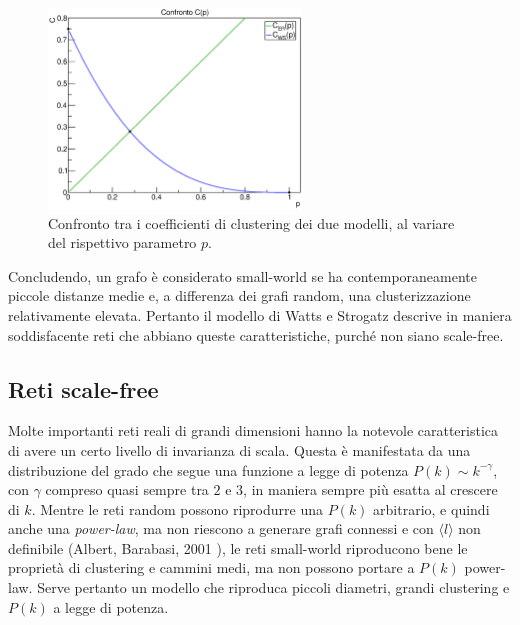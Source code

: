 \begin{figure}[t!]
	\centering
	\includegraphics[width=0.6\textwidth]{./Immagini/Par1/confrontoC}
	\caption{Confronto tra i coefficienti di clustering dei due modelli, al variare del rispettivo parametro $p$.}
	\label{fig:ring}
\end{figure}

Concludendo, un grafo è considerato small-world se ha contemporaneamente piccole distanze medie e, a differenza dei grafi random,  una clusterizzazione relativamente elevata. Pertanto il modello di Watts e Strogatz descrive in maniera soddisfacente reti che abbiano queste caratteristiche, purché non siano scale-free.

\subsection{Reti scale-free} 
Molte importanti reti reali di grandi dimensioni hanno la notevole caratteristica di avere un certo livello di invarianza di scala. Questa è manifestata da una distribuzione del grado che segue una funzione a legge di potenza $P(k)\sim k^{-\gamma}$, con $\gamma$ compreso quasi sempre tra $2$ e $3$, in maniera sempre più esatta al crescere di $k$. Mentre le reti random possono riprodurre una $P(k)$ arbitrario, e quindi anche una \emph{power-law}, ma non riescono a generare grafi connessi e con $\langle l \rangle$ non definibile (Albert, Barabasi, 2001 
), le reti small-world riproducono bene le proprietà di clustering e cammini medi, ma non possono portare a $P(k)$ power-law. Serve pertanto un modello che riproduca piccoli diametri, grandi clustering e $P(k)$ a legge di potenza.

